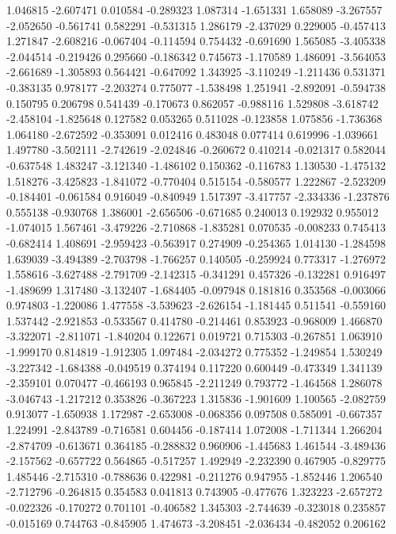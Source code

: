 1.046815
-2.607471
0.010584
-0.289323
1.087314
-1.651331
1.658089
-3.267557
-2.052650
-0.561741
0.582291
-0.531315
1.286179
-2.437029
0.229005
-0.457413
1.271847
-2.608216
-0.067404
-0.114594
0.754432
-0.691690
1.565085
-3.405338
-2.044514
-0.219426
0.295660
-0.186342
0.745673
-1.170589
1.486091
-3.564053
-2.661689
-1.305893
0.564421
-0.647092
1.343925
-3.110249
-1.211436
0.531371
-0.383135
0.978177
-2.203274
0.775077
-1.538498
1.251941
-2.892091
-0.594738
0.150795
0.206798
0.541439
-0.170673
0.862057
-0.988116
1.529808
-3.618742
-2.458104
-1.825648
0.127582
0.053265
0.511028
-0.123858
1.075856
-1.736368
1.064180
-2.672592
-0.353091
0.012416
0.483048
0.077414
0.619996
-1.039661
1.497780
-3.502111
-2.742619
-2.024846
-0.260672
0.410214
-0.021317
0.582044
-0.637548
1.483247
-3.121340
-1.486102
0.150362
-0.116783
1.130530
-1.475132
1.518276
-3.425823
-1.841072
-0.770404
0.515154
-0.580577
1.222867
-2.523209
-0.184401
-0.061584
0.916049
-0.840949
1.517397
-3.417757
-2.334336
-1.237876
0.555138
-0.930768
1.386001
-2.656506
-0.671685
0.240013
0.192932
0.955012
-1.074015
1.567461
-3.479226
-2.710868
-1.835281
0.070535
-0.008233
0.745413
-0.682414
1.408691
-2.959423
-0.563917
0.274909
-0.254365
1.014130
-1.284598
1.639039
-3.494389
-2.703798
-1.766257
0.140505
-0.259924
0.773317
-1.276972
1.558616
-3.627488
-2.791709
-2.142315
-0.341291
0.457326
-0.132281
0.916497
-1.489699
1.317480
-3.132407
-1.684405
-0.097948
0.181816
0.353568
-0.003066
0.974803
-1.220086
1.477558
-3.539623
-2.626154
-1.181445
0.511541
-0.559160
1.537442
-2.921853
-0.533567
0.414780
-0.214461
0.853923
-0.968009
1.466870
-3.322071
-2.811071
-1.840204
0.122671
0.019721
0.715303
-0.267851
1.063910
-1.999170
0.814819
-1.912305
1.097484
-2.034272
0.775352
-1.249854
1.530249
-3.227342
-1.684388
-0.049519
0.374194
0.117220
0.600449
-0.473349
1.341139
-2.359101
0.070477
-0.466193
0.965845
-2.211249
0.793772
-1.464568
1.286078
-3.046743
-1.217212
0.353826
-0.367223
1.315836
-1.901609
1.100565
-2.082759
0.913077
-1.650938
1.172987
-2.653008
-0.068356
0.097508
0.585091
-0.667357
1.224991
-2.843789
-0.716581
0.604456
-0.187414
1.072008
-1.711344
1.266204
-2.874709
-0.613671
0.364185
-0.288832
0.960906
-1.445683
1.461544
-3.489436
-2.157562
-0.657722
0.564865
-0.517257
1.492949
-2.232390
0.467905
-0.829775
1.485446
-2.715310
-0.788636
0.422981
-0.211276
0.947955
-1.852446
1.206540
-2.712796
-0.264815
0.354583
0.041813
0.743905
-0.477676
1.323223
-2.657272
-0.022326
-0.170272
0.701101
-0.406582
1.345303
-2.744639
-0.323018
0.235857
-0.015169
0.744763
-0.845905
1.474673
-3.208451
-2.036434
-0.482052
0.206162

